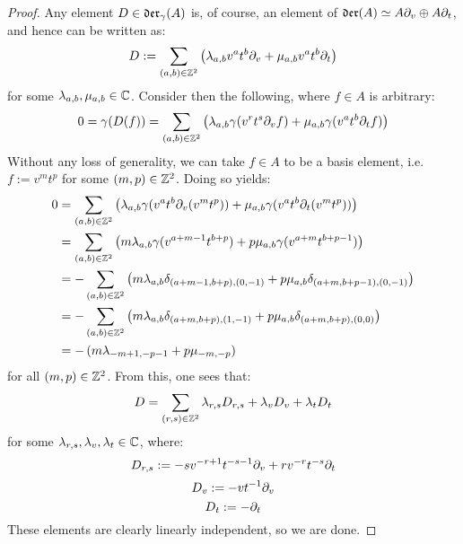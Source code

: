            \begin{proof}
                Any element $D \in \mathfrak{der}_{\gamma}(A)$ is, of course, an element of $\mathfrak{der}(A) \simeq A \partial_v \oplus A \partial_t$, and hence can be written as:
                    $$D := \sum_{(a, b) \in \mathbb{Z}^2} \left( \lambda_{a, b} v^a t^b \partial_v + \mu_{a, b} v^a t^b \partial_t \right)$$
                for some $\lambda_{a, b}, \mu_{a, b} \in \mathbb{C}$. Consider then the following, where $f \in A$ is arbitrary:
                    $$0 =\gamma(D(f)) = \sum_{(a, b) \in \mathbb{Z}^2} \left( \lambda_{a, b} \gamma(v^r t^s \partial_v f) + \mu_{a, b} \gamma(v^a t^b \partial_t f) \right)$$
                Without any loss of generality, we can take $f \in A$ to be a basis element, i.e. $f := v^m t^p$ for some $(m, p) \in \mathbb{Z}^2$. Doing so yields:
                    $$
                        \begin{aligned}
                            0 & = \sum_{(a, b) \in \mathbb{Z}^2} \left( \lambda_{a, b} \gamma(v^a t^b \partial_v(v^m t^p)) + \mu_{a, b} \gamma(v^a t^b \partial_t(v^m t^p)) \right)
                            \\
                            & = \sum_{(a, b) \in \mathbb{Z}^2} \left( m\lambda_{a, b} \gamma(v^{a + m - 1} t^{b + p}) + p \mu_{a, b} \gamma( v^{a + m} t^{b + p - 1} ) \right)
                            \\
                            & = -\sum_{(a, b) \in \mathbb{Z}^2} \left( m \lambda_{a, b} \delta_{(a + m - 1, b + p), (0, -1)} + p \mu_{a, b} \delta_{(a + m, b + p - 1), (0, -1)} \right)
                            \\
                            & = -\sum_{(a, b) \in \mathbb{Z}^2} \left( m \lambda_{a, b} \delta_{(a + m, b + p), (1, -1)} + p \mu_{a, b} \delta_{(a + m, b + p), (0, 0)} \right)
                            \\
                            & = -\left( m \lambda_{-m + 1, -p - 1} + p \mu_{-m, -p} \right)
                        \end{aligned} 
                    $$
                for all $(m, p) \in \mathbb{Z}^2$. From this, one sees that:
                    $$D = \sum_{(r, s) \in \mathbb{Z}^2} \lambda_{r, s} D_{r, s} + \lambda_v D_v + \lambda_t D_t$$
                for some $\lambda_{r, s}, \lambda_v, \lambda_t \in \mathbb{C}$, where:
                    $$D_{r, s} := -s v^{-r + 1} t^{-s - 1} \partial_v + r v^{-r} t^{-s} \partial_t$$
                    $$D_v := -v t^{-1} \partial_v$$
                    $$D_t := -\partial_t$$
                These elements are clearly linearly independent, so we are done.
            \end{proof}
